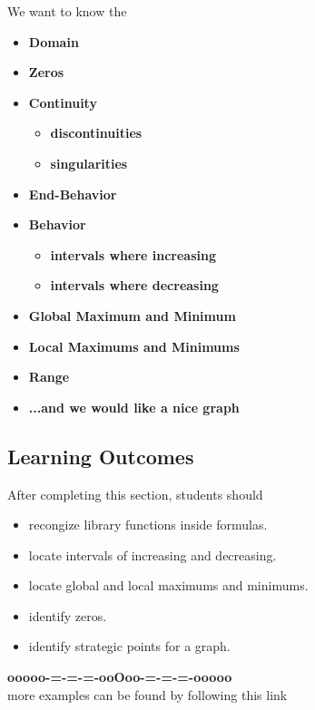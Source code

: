 \documentclass{ximera}
\begin{document}
We want to know the 
\begin{itemize}
     \item \textbf{\textcolor{red!80!black}{Domain}} 
     \item \textbf{\textcolor{red!80!black}{Zeros}} 
     \item \textbf{\textcolor{red!80!black}{Continuity}} 
\begin{itemize}
     \item \textbf{\textcolor{purple!85!blue}{discontinuities}} 
     \item \textbf{\textcolor{purple!85!blue}{singularities}} 
\end{itemize}
     \item \textbf{\textcolor{red!80!black}{End-Behavior}} 
     \item \textbf{\textcolor{red!80!black}{Behavior}} 
\begin{itemize}
     \item \textbf{\textcolor{purple!85!blue}{intervals where increasing}} 
     \item \textbf{\textcolor{purple!85!blue}{intervals where decreasing}} 
\end{itemize}
     \item \textbf{\textcolor{red!80!black}{Global Maximum and Minimum}} 
     \item \textbf{\textcolor{red!80!black}{Local Maximums and Minimums}} 
     \item \textbf{\textcolor{red!80!black}{Range}} 
     \item \textbf{\textcolor{blue!55!black}{...and we would like a nice graph}} 
\end{itemize}








\subsection{Learning Outcomes}

\begin{sectionOutcomes}
After completing this section, students should 

\begin{itemize}
\item recongize library functions inside formulas.
\item locate intervals of increasing and decreasing.
\item locate global and local maximums and minimums.
\item identify zeros.
\item identify strategic points for a graph.
\end{itemize}
\end{sectionOutcomes}










\begin{center}
\textbf{\textcolor{green!50!black}{ooooo-=-=-=-ooOoo-=-=-=-ooooo}} \\

more examples can be found by following this link\\ 

\end{center}
\end{document}
